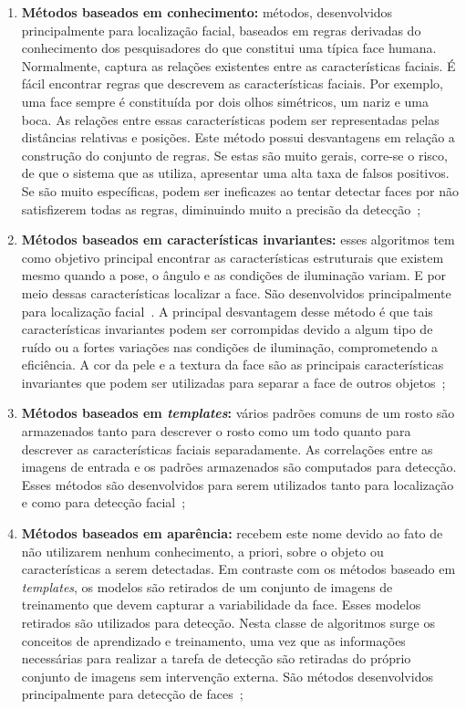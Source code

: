 	\begin{enumerate}
		\item \textbf{Métodos baseados em conhecimento:} métodos, desenvolvidos principalmente para localização facial, baseados em regras derivadas do conhecimento dos pesquisadores do que constitui uma típica face humana. Normalmente, captura as relações existentes entre as características faciais. É fácil encontrar regras que descrevem as características faciais. Por exemplo, uma face sempre é constituída por dois olhos simétricos, um nariz e uma boca. As relações entre essas características podem ser representadas pelas distâncias relativas e posições. Este método possui desvantagens em relação a construção do conjunto de regras. Se estas são muito gerais, corre-se o risco, de que o sistema que as utiliza, apresentar uma alta taxa de falsos positivos. Se são muito específicas, podem ser ineficazes ao tentar detectar faces por não satisfizerem todas as regras, diminuindo muito a precisão da detecção~\cite{yang,lopes};

		\item \textbf{Métodos baseados em características invariantes:} esses algoritmos tem como objetivo principal encontrar as características estruturais que existem mesmo quando a pose, o ângulo e as condições de iluminação variam. E por meio dessas características localizar a face. São desenvolvidos principalmente para localização facial~\cite{yang}. A principal desvantagem desse método é que tais características invariantes podem ser corrompidas devido a algum tipo de ruído ou a fortes variações nas condições de iluminação, comprometendo a eficiência. A cor da pele e a textura da face são as principais características invariantes que podem ser utilizadas para separar a face de outros objetos~\cite{lopes};

		\item \textbf{Métodos baseados em \textit{templates}:} vários padrões comuns de um rosto são armazenados tanto para descrever o rosto como um todo quanto para descrever as características faciais separadamente. As correlações entre as imagens de entrada e os padrões armazenados são computados para detecção. Esses métodos são desenvolvidos para serem utilizados tanto para localização e como para detecção facial~\cite{yang};

		\item \textbf{Métodos baseados em aparência:} recebem este nome devido ao fato de não utilizarem nenhum conhecimento, a priori, sobre o objeto ou características a serem detectadas. Em contraste com os métodos baseado em \textit{templates}, os modelos são retirados de um conjunto de imagens de treinamento que devem capturar a variabilidade da face. Esses modelos retirados são utilizados para detecção. Nesta classe de algoritmos surge os conceitos de aprendizado e treinamento, uma vez que as informações necessárias para realizar a tarefa de detecção são retiradas do próprio conjunto de imagens sem intervenção externa. São métodos desenvolvidos principalmente para detecção de faces~\cite{yang, lopes};

	\end{enumerate}

